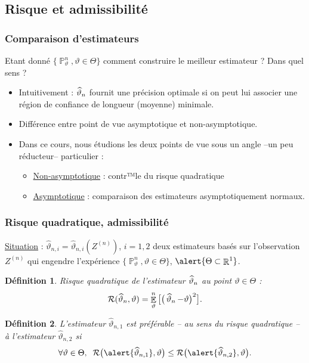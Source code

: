 \documentclass{beamer}
\newtheorem{df}{Définition}
\DeclareMathOperator{\E}{{\mathbb E}}
\DeclareMathOperator{\R}{{\mathbb R}}
\DeclareMathOperator{\PP}{{\mathbb P}}
\DeclareMathOperator{\est}{\widehat \vartheta_{\mathnormal{n}}}
\begin{document}
\subsection{Risque et admissibilité}

\begin{frame}
\frametitle{Comparaison d'estimateurs}

Etant donné  $\{\PP_\vartheta^n,\vartheta \in \Theta\}$ comment \alert{construire} le \alert{meilleur} estimateur ? Dans quel sens ?
\begin{itemize}
\item \alert{Intuitivement } : $\est$ fournit une précision optimale si on peut lui associer une région de confiance de longueur (moyenne) minimale.
\item Différence entre point de vue \alert{asymptotique} et \alert{non-asymptotique}.
\item \alert{Dans ce cours}, nous étudions les deux points de vue sous un angle --un peu réducteur-- particulier :
\begin{itemize}
\item \underline{Non-asymptotique} : contr™le du \alert{risque quadratique}
\item \underline{Asymptotique} : comparaison des estimateurs \alert{asymptotiquement normaux}.
\end{itemize}
\end{itemize}
\end{frame}

\begin{frame}
\frametitle{Risque quadratique, admissibilité}
\underline{Situation} : $\widehat \vartheta_{n,i} = \widehat \vartheta_{n,i}(Z^{(n)})$, $i=1,2$ deux estimateurs basés sur l'observation $Z^{(n)}$ qui engendre l'expérience $\{\PP_\vartheta^n,\vartheta \in \Theta\}$, $\alert{\Theta \subset \R^1}$.
\begin{df}
\alert{Risque quadratique de l'estimateur} $\est$ au point $\vartheta \in \Theta$ :
$${\mathcal R}(\est,\vartheta) = \E_\vartheta^n\big[\big(\est -\vartheta\big)^2\big].$$
\end{df}
\begin{df}
L'estimateur $\widehat \vartheta_{n,1}$ est \alert{préférable} -- au sens du risque quadratique -- à l'estimateur $\widehat \vartheta_{n,2}$ si
$$\forall \vartheta \in \Theta,\;\;{\mathcal R}\big(\alert{\widehat \vartheta_{n,1}},\vartheta\big) \leq {\mathcal R}\big(\alert{\widehat \vartheta_{n,2}},\vartheta\big).$$
\end{df}
\end{frame}
\end{document}
